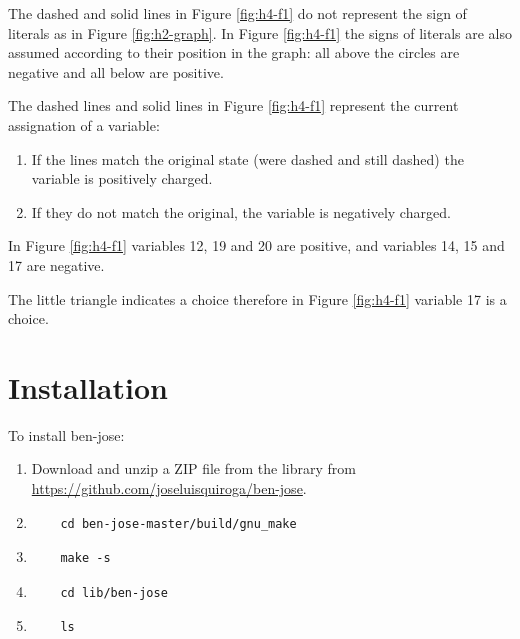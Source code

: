 \documentclass{easychair}
\begin{document}
The dashed and solid lines in Figure \ref{fig:h4-f1} do not represent the sign of literals as in Figure \ref{fig:h2-graph}. In Figure \ref{fig:h4-f1} the signs of literals are also assumed according to their position in the graph: all above the circles are negative and all below are positive. 

The dashed lines and solid lines in Figure \ref{fig:h4-f1} represent the current assignation of a variable: 

\begin{enumerate}
\item
If the lines match the original state (were dashed and still dashed) the variable is positively charged.

\item
If they do not match the original, the variable is negatively charged.
\end{enumerate}

In Figure \ref{fig:h4-f1} variables 12, 19 and 20 are positive, and variables 14, 15 and 17 are negative.

The little triangle indicates a choice therefore in Figure \ref{fig:h4-f1} variable 17 is a choice.

\section{Installation}
\label{sect:installation}

To install ben-jose:

\begin{enumerate}
\item
Download and unzip a ZIP file from the library from \url{https://github.com/joseluisquiroga/ben-jose}.

\item
\begin{verbatim}
	cd ben-jose-master/build/gnu_make
\end{verbatim}

\item
\begin{verbatim}
	make -s
\end{verbatim}

\item
\begin{verbatim}
	cd lib/ben-jose
\end{verbatim}

\item
\begin{verbatim}
	ls
\end{verbatim}
\end{enumerate}
\end{document}
